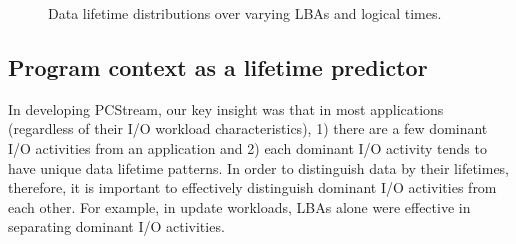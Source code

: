 \begin{figure}[t]
	\vspace{-10pt}
	\centering
	\vspace{-10pt}
	\caption{
		Data lifetime distributions over varying LBAs and logical times.}
		\label{fig:lba_lifetime}
	\vspace{-15pt}
\end{figure}

\vspace{-5pt}
\subsection{Program context as a lifetime predictor}
In developing {\sf PCStream},  our key insight was that in most applications 
(regardless of their I/O workload characteristics), 
1) there are a few dominant I/O activities from an application 
and 2) each dominant I/O activity tends to have unique data lifetime patterns.   
In order to distinguish data by their lifetimes, therefore, 
it is important to effectively distinguish dominant I/O activities from each other.  
For example, in update workloads, 
LBAs alone were effective in separating dominant I/O activities.  

